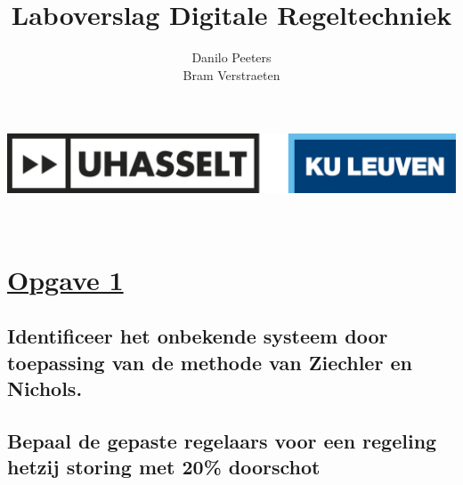 \documentclass[a4paper, 12pt]{article}
\title{Laboverslag Digitale Regeltechniek}
\author{Danilo Peeters \\ Bram Verstraeten}
\begin{document}
\makeatletter
    \begin{titlepage}
	    \includegraphics[width=1\linewidth]{Logo_Uhasselt_KULeuven.jpeg}\\[30ex]
        \begin{center}
            {\huge \@title }\\[20ex] 
            {\large\@author}
        \end{center}
    \end{titlepage}
\makeatother

\newpage

\section{\underline{Opgave 1}}

\subsection{Identificeer het onbekende systeem door toepassing van de methode van Ziechler en Nichols.}

\begin{table}[!h]
\begin{large}
\centering
{}
\end{large}
\end{table}

\subsection{Bepaal de gepaste regelaars voor een regeling hetzij storing met 20\% doorschot}
\end{document}
